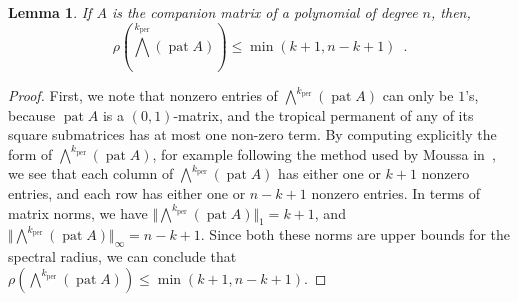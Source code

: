 \documentclass[a4paper]{amsart}
\theoremstyle{definition}
\theoremstyle{plain}
\newtheorem{lem}[thm]{Lemma}
\theoremstyle{remark}
\begin{document}
\begin{lem}\label{lem-explicit}
If $A$ is the companion matrix of a polynomial of degree $n$, then, 
\[
 {\rho({\mbox{$\bigwedge$}}^k_\operatorname{per} (\operatorname{pat} A)) {\leqslant} \min (k+1, n-k+1)}
\enspace .
\]
\end{lem}
\begin{proof}
First, we note that nonzero entries of ${\mbox{$\bigwedge$}}^k_\operatorname{per} (\operatorname{pat} A)$ can only be $1$'s, because $\operatorname{pat} A$ is a $(0,1)$-matrix, and the tropical permanent of any of its square submatrices has at most one non-zero term.
By computing explicitly the form of ${\mbox{$\bigwedge$}}^k_\operatorname{per} (\operatorname{pat} A)$, 
for example following the method used by Moussa in~\cite{moussa},
we see that each column of ${\mbox{$\bigwedge$}}^k_\operatorname{per} (\operatorname{pat} A)$ has either one or $k+1$ nonzero entries,
and each row has either one or $n-k+1$ nonzero entries.
In terms of matrix norms, we have ${\Vert {\mbox{$\bigwedge$}}^k_\operatorname{per} (\operatorname{pat} A) \Vert}_1 = k+1$,
and ${\Vert {\mbox{$\bigwedge$}}^k_\operatorname{per} (\operatorname{pat} A) \Vert}_\infty = n-k+1$.
Since both these norms are upper bounds for the spectral radius,
we can conclude that ${\rho({\mbox{$\bigwedge$}}^k_\operatorname{per} (\operatorname{pat} A)) {\leqslant} \min (k+1, n-k+1)}$.
\end{proof}
\end{document}
